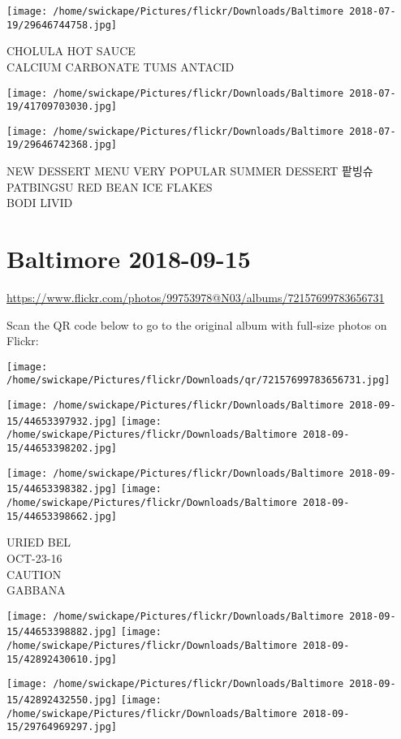 \documentclass[10pt,letterpaper]{article}
\begin{document}
\vspace{0.25in}
\texttt{[image: /home/swickape/Pictures/flickr/Downloads/Baltimore 2018-07-19/29646744758.jpg]}

CHOLULA HOT SAUCE\\
CALCIUM CARBONATE TUMS ANTACID
\pagebreak

\texttt{[image: /home/swickape/Pictures/flickr/Downloads/Baltimore 2018-07-19/41709703030.jpg]}

\vspace{0.25in}
\texttt{[image: /home/swickape/Pictures/flickr/Downloads/Baltimore 2018-07-19/29646742368.jpg]}

NEW DESSERT MENU VERY POPULAR SUMMER DESSERT 팥빙슈 PATBINGSU RED BEAN ICE FLAKES\\
BODI LIVID
\pagebreak

\section*{Baltimore 2018-09-15}

\url{https://www.flickr.com/photos/99753978@N03/albums/72157699783656731}

Scan the QR code below to go to the original album with full-size photos on Flickr:

\texttt{[image: /home/swickape/Pictures/flickr/Downloads/qr/72157699783656731.jpg]}
\pagebreak

\texttt{[image: /home/swickape/Pictures/flickr/Downloads/Baltimore 2018-09-15/44653397932.jpg]}
\texttt{[image: /home/swickape/Pictures/flickr/Downloads/Baltimore 2018-09-15/44653398202.jpg]}

\texttt{[image: /home/swickape/Pictures/flickr/Downloads/Baltimore 2018-09-15/44653398382.jpg]}
\texttt{[image: /home/swickape/Pictures/flickr/Downloads/Baltimore 2018-09-15/44653398662.jpg]}

URIED BEL\\
OCT{-}23{-}16\\
CAUTION\\
GABBANA
\pagebreak

\texttt{[image: /home/swickape/Pictures/flickr/Downloads/Baltimore 2018-09-15/44653398882.jpg]}
\texttt{[image: /home/swickape/Pictures/flickr/Downloads/Baltimore 2018-09-15/42892430610.jpg]}

\texttt{[image: /home/swickape/Pictures/flickr/Downloads/Baltimore 2018-09-15/42892432550.jpg]}
\texttt{[image: /home/swickape/Pictures/flickr/Downloads/Baltimore 2018-09-15/29764969297.jpg]}
\end{document}
